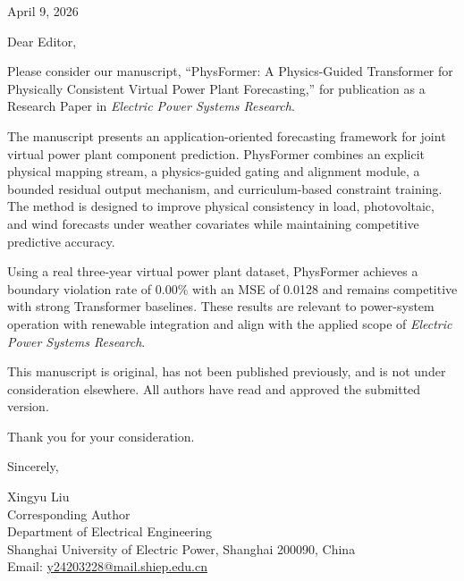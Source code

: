 \documentclass[12pt]{article}
\begin{document}
\begin{flushright}
April 9, 2026
\end{flushright}

Dear Editor,

Please consider our manuscript, ``PhysFormer: A Physics-Guided Transformer for Physically Consistent Virtual Power Plant Forecasting,'' for publication as a Research Paper in \textit{Electric Power Systems Research}.

The manuscript presents an application-oriented forecasting framework for joint virtual power plant component prediction. PhysFormer combines an explicit physical mapping stream, a physics-guided gating and alignment module, a bounded residual output mechanism, and curriculum-based constraint training. The method is designed to improve physical consistency in load, photovoltaic, and wind forecasts under weather covariates while maintaining competitive predictive accuracy.

Using a real three-year virtual power plant dataset, PhysFormer achieves a boundary violation rate of 0.00\% with an MSE of 0.0128 and remains competitive with strong Transformer baselines. These results are relevant to power-system operation with renewable integration and align with the applied scope of \textit{Electric Power Systems Research}.

This manuscript is original, has not been published previously, and is not under consideration elsewhere. All authors have read and approved the submitted version.

Thank you for your consideration.

Sincerely,

Xingyu Liu \\
Corresponding Author \\
Department of Electrical Engineering \\
Shanghai University of Electric Power, Shanghai 200090, China \\
Email: \href{mailto:y24203228@mail.shiep.edu.cn}{y24203228@mail.shiep.edu.cn}
\end{document}
